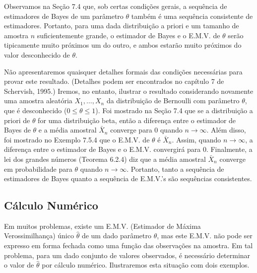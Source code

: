 Observamos na Seção 7.4 que, sob certas condições gerais, a sequência de estimadores de Bayes de um parâmetro $\theta$ também é uma sequência consistente de estimadores. Portanto, para uma dada distribuição a priori e um tamanho de amostra $n$ suficientemente grande, o estimador de Bayes e o E.M.V. de $\theta$ serão tipicamente muito próximos um do outro, e ambos estarão muito próximos do valor desconhecido de $\theta$.

Não apresentaremos quaisquer detalhes formais das condições necessárias para provar este resultado. (Detalhes podem ser encontrados no capítulo 7 de Schervish, 1995.) Iremos, no entanto, ilustrar o resultado considerando novamente uma amostra aleatória $X_1, \dots, X_n$ da distribuição de Bernoulli com parâmetro $\theta$, que é desconhecido ($0 \le \theta \le 1$). Foi mostrado na Seção 7.4 que se a distribuição a priori de $\theta$ for uma distribuição beta, então a diferença entre o estimador de Bayes de $\theta$ e a média amostral $\bar{X}_n$ converge para 0 quando $n \to \infty$. Além disso, foi mostrado no Exemplo 7.5.4 que o E.M.V. de $\theta$ é $\bar{X}_n$. Assim, quando $n \to \infty$, a diferença entre o estimador de Bayes e o E.M.V. convergirá para 0. Finalmente, a lei dos grandes números (Teorema 6.2.4) diz que a média amostral $\bar{X}_n$ converge em probabilidade para $\theta$ quando $n \to \infty$. Portanto, tanto a sequência de estimadores de Bayes quanto a sequência de E.M.V.'s são sequências consistentes.

\subsection*{Cálculo Numérico}

Em muitos problemas, existe um E.M.V. (Estimador de Máxima Verossimilhança) único $\hat{\theta}$ de um dado parâmetro $\theta$, mas este E.M.V. não pode ser expresso em forma fechada como uma função das observações na amostra. Em tal problema, para um dado conjunto de valores observados, é necessário determinar o valor de $\hat{\theta}$ por cálculo numérico. Ilustraremos esta situação com dois exemplos.

